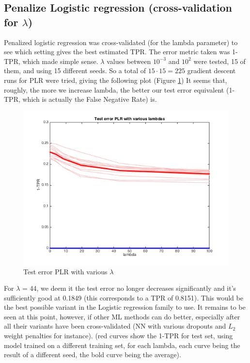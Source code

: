 \documentclass{article} %
\begin{document}
\subsection{Penalize Logistic regression (cross-validation for $\lambda$)}
Penalized logistic regression was cross-validated (for the lambda parameter) to see which setting gives the best estimated TPR. The error metric taken was 1-TPR, which made simple sense. $\lambda$ values between $10^{-3}$ and $10^2$ were tested, 15 of them, and using 15 different seeds. So a total of $15 \cdot 15=225$ gradient descent runs for PLR were tried, giving the following plot (Figure \ref{fig:TEPLR})
It seems that, roughly, the more we increase lambda, the better our test error equivalent (1-TPR, which is actually the False Negative Rate) is.
\begin{figure}[h!]
\centering
\includegraphics[scale=0.6]{images/PLRKCVplot.png}
\caption{Test error PLR with various $\lambda$}
\label{fig:TEPLR}
\end{figure} For $\lambda$ = 44, we deem it the test error no longer decreases significantly and it’s sufficiently good at 0.1849 (this corresponds to a TPR of 0.8151). This would be the best possible variant in the Logistic regression family to use. It remains to be seen at this point, however, if other ML methods can do better, especially after all their variants have been cross-validated (NN with various dropouts and $L_2$ weight penalties for instance). (red curves show the 1-TPR for test set, using model trained on a different training set, for each lambda, each curve being the result of a different seed, the bold curve being the average).
\end{document}
